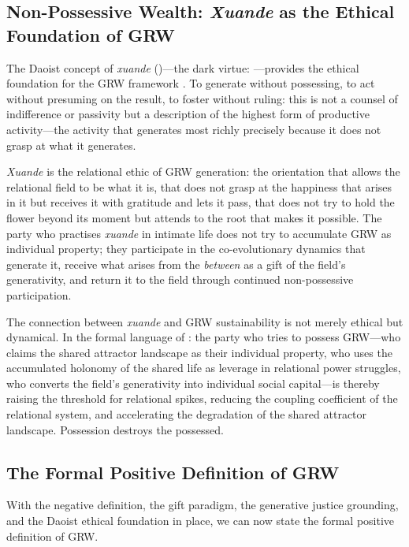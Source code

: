 \subsection{Non-Possessive Wealth: \emph{Xuande} as the Ethical Foundation of GRW}
\label{p15:subsec:xuande}

\noindent
The Daoist concept of \emph{xuande} ()---the dark virtue: ---provides the ethical foundation for the GRW framework \parencite{laozi1963}. To generate without possessing, to act without presuming on the result, to foster without ruling: this is not a counsel of indifference or passivity but a description of the highest form of productive activity---the activity that generates most richly precisely because it does not grasp at what it generates.

\emph{Xuande} is the relational ethic of GRW generation: the orientation that allows the relational field to be what it is, that does not grasp at the happiness that arises in it but receives it with gratitude and lets it pass, that does not try to hold the flower beyond its moment but attends to the root that makes it possible. The party who practises \emph{xuande} in intimate life does not try to accumulate GRW as individual property; they participate in the co-evolutionary dynamics that generate it, receive what arises from the \emph{between} as a gift of the field's generativity, and return it to the field through continued non-possessive participation.

The connection between \emph{xuande} and GRW sustainability is not merely ethical but dynamical. In the formal language of  \parencite{paperxiv}: the party who tries to possess GRW---who claims the shared attractor landscape as their individual property, who uses the accumulated holonomy of the shared life as leverage in relational power struggles, who converts the field's generativity into individual social capital---is thereby raising the threshold for relational spikes, reducing the coupling coefficient of the relational system, and accelerating the degradation of the shared attractor landscape. Possession destroys the possessed.

\subsection{The Formal Positive Definition of GRW}
\label{p15:subsec:formal_definition}

\noindent
With the negative definition, the gift paradigm, the generative justice grounding, and the Daoist ethical foundation in place, we can now state the formal positive definition of GRW.

